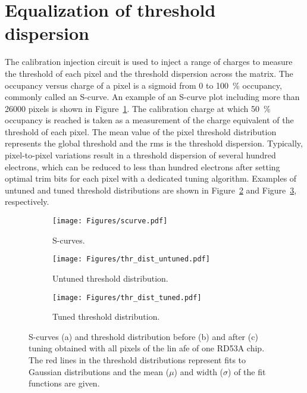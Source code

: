 
\section{Equalization of threshold dispersion}
\label{sec:rad}

The calibration injection circuit is used to inject a range of charges to measure the threshold of each pixel and the threshold dispersion across the matrix. The occupancy versus charge of a pixel is a sigmoid from \num{0} to \SI{100}{\percent} occupancy, commonly called an S-curve. An example of an S-curve plot including more than \num{26000} pixels is shown in Figure~\ref{fig:scurves}. 
The calibration charge at which \SI{50}{\percent} occupancy is reached is taken as a measurement of the charge equivalent of the threshold of each pixel. 
The mean value of the pixel threshold distribution represents the global threshold and the \gls{rms} is the threshold dispersion.
Typically, pixel-to-pixel variations result in a threshold dispersion of several hundred electrons, which can be reduced to less than hundred electrons after setting optimal trim bits for each pixel with a dedicated tuning algorithm. Examples of untuned and tuned threshold distributions are shown in Figure~\ref{fig:uthrdist} and Figure~\ref{fig:tthrdist}, respectively.

\begin{figure}[ht]
    \centering
    \begin{subfigure}{0.37\textwidth}
        \centering
        \captionsetup{justification=centering}
        \texttt{[image: Figures/scurve.pdf]}
        \caption{S-curves.\newline}
        \label{fig:scurves}
    \end{subfigure}
    \hfill
    \begin{subfigure}{0.29\textwidth}
        \centering
        \captionsetup{justification=centering}
        \texttt{[image: Figures/thr\_dist\_untuned.pdf]}
        \caption{Untuned threshold distribution.}
        \label{fig:uthrdist}
    \end{subfigure}
    \hfill
    \begin{subfigure}{0.29\textwidth}
        \centering
        \captionsetup{justification=centering}
        \texttt{[image: Figures/thr\_dist\_tuned.pdf]}
        \caption{Tuned threshold distribution.}
        \label{fig:tthrdist}
    \end{subfigure}
    \label{fig:thrdist}
    \caption{S-curves (a) and threshold distribution before (b) and after (c) tuning obtained with all pixels of the \gls{lin} \gls{afe} of one RD53A chip. The red lines in the threshold distributions represent fits to Gaussian distributions and the mean ($\mu$) and width ($\sigma$) of the fit functions are given.}
\end{figure}

